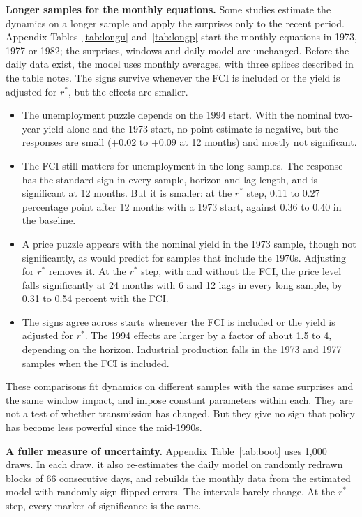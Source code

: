 \documentclass[11pt]{article}
\newcommand{\rs}{r^{*}}
\begin{document}
\textbf{Longer samples for the monthly equations.} Some studies estimate the dynamics on a longer sample and apply the surprises only to the recent period. Appendix Tables~\ref{tab:longu} and~\ref{tab:longp} start the monthly equations in 1973, 1977 or 1982; the surprises, windows and daily model are unchanged. Before the daily data exist, the model uses monthly averages, with three splices described in the table notes. The signs survive whenever the FCI is included or the yield is adjusted for $\rs$, but the effects are smaller.
\begin{itemize}
\item The unemployment puzzle depends on the 1994 start. With the nominal two-year yield alone and the 1973 start, no point estimate is negative, but the responses are small ($+0.02$ to $+0.09$ at 12 months) and mostly not significant.
\item The FCI still matters for unemployment in the long samples. The response has the standard sign in every sample, horizon and lag length, and is significant at 12 months. But it is smaller: at the $\rs$ step, 0.11 to 0.27 percentage point after 12 months with a 1973 start, against 0.36 to 0.40 in the baseline.
\item A price puzzle appears with the nominal yield in the 1973 sample, though not significantly, as \citet{castelnuovo2010} would predict for samples that include the 1970s. Adjusting for $\rs$ removes it. At the $\rs$ step, with and without the FCI, the price level falls significantly at 24 months with 6 and 12 lags in every long sample, by 0.31 to 0.54 percent with the FCI.
\item The signs agree across starts whenever the FCI is included or the yield is adjusted for $\rs$. The 1994 effects are larger by a factor of about 1.5 to 4, depending on the horizon. Industrial production falls in the 1973 and 1977 samples when the FCI is included.
\end{itemize}
These comparisons fit dynamics on different samples with the same surprises and the same window impact, and impose constant parameters within each. They are not a test of whether transmission has changed. But they give no sign that policy has become less powerful since the mid-1990s.

\textbf{A fuller measure of uncertainty.} Appendix Table~\ref{tab:boot} uses 1,000 draws. In each draw, it also re-estimates the daily model on randomly redrawn blocks of 66 consecutive days, and rebuilds the monthly data from the estimated model with randomly sign-flipped errors. The intervals barely change. At the $\rs$ step, every marker of significance is the same.
\end{document}
